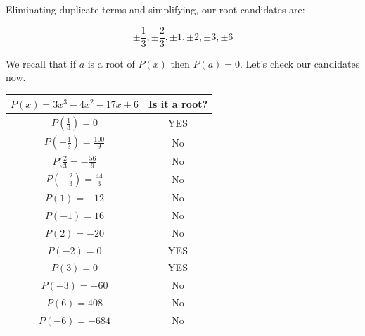         \noindent Eliminating duplicate terms and simplifying, our root candidates are:

        \begin{equation*}
            \pm \frac{1}{3}, \pm\frac{2}{3}, \pm 1, \pm 2, \pm 3, \pm 6
        \end{equation*}

        \noindent We recall that if $a$ is a root of $P(x)$ then $P(a)=0$. Let's check our
        candidates now.

        \begin{center}
            \begin{tabular}{|c|c|}
                \hline
                \textbf{$P(x)=3x^3-4x^2-17x+6$} & \textbf{Is it a root?} \\
                \hline
                $P(\frac{1}{3})=0$              & YES                    \\
                \hline
                $P(-\frac{1}{3})=\frac{100}{9}$ & No                     \\
                \hline
                $P(\frac{2}{3}=-\frac{56}{9}$   & No                     \\
                \hline
                $P(-\frac{2}{3})=\frac{44}{3}$  & No                     \\
                \hline
                $P(1)=-12$                      & No                     \\
                \hline
                $P(-1)=16$                      & No                     \\
                \hline
                $P(2)=-20$                      & No                     \\
                \hline
                $P(-2)=0$                       & YES                    \\
                \hline
                $P(3)=0$                        & YES                    \\
                \hline
                $P(-3)=-60$                     & No                     \\
                \hline
                $P(6)=408$                      & No                     \\
                \hline
                $P(-6)=-684$                    & No                     \\
                \hline
            \end{tabular}
        \end{center}